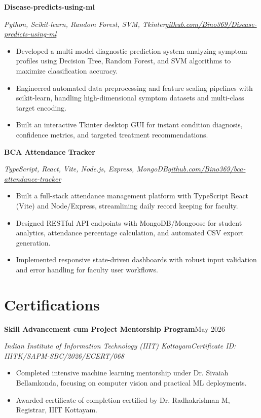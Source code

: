 \documentclass[10pt,a4paper]{article}
\newcommand{\resumeSubheading}[4]{%
  \textbf{#1}\hfill #2\par
  \textit{#3}\hfill \textit{#4}\par\vspace{1.5pt}%
}
\newenvironment{resumeEntry}[4]{
  \resumeSubheading{#1}{#2}{#3}{#4}
  \begin{itemize}
}{
  \end{itemize}\vspace{3.5pt}
}
\newcommand{\ghuser}{Bino369}
\newcommand{\ghrepo}[1]{\href{https://github.com/\ghuser/#1}{github.com/\ghuser/#1}}
\begin{document}
\begin{resumeEntry}
  {Disease-predicts-using-ml}{}
  {Python, Scikit-learn, Random Forest, SVM, Tkinter}{\ghrepo{Disease-predicts-using-ml}}
  \item Developed a multi-model diagnostic prediction system analyzing symptom profiles using Decision Tree, Random Forest, and SVM algorithms to maximize classification accuracy.
  \item Engineered automated data preprocessing and feature scaling pipelines with scikit-learn, handling high-dimensional symptom datasets and multi-class target encoding.
  \item Built an interactive Tkinter desktop GUI for instant condition diagnosis, confidence metrics, and targeted treatment recommendations.
\end{resumeEntry}

\begin{resumeEntry}
  {BCA Attendance Tracker}{}
  {TypeScript, React, Vite, Node.js, Express, MongoDB}{\ghrepo{bca-attendance-tracker}}
  \item Built a full-stack attendance management platform with TypeScript React (Vite) and Node/Express, streamlining daily record keeping for faculty.
  \item Designed RESTful API endpoints with MongoDB/Mongoose for student analytics, attendance percentage calculation, and automated CSV export generation.
  \item Implemented responsive state-driven dashboards with robust input validation and error handling for faculty user workflows.
\end{resumeEntry}

\section*{Certifications}
\begin{resumeEntry}
  {Skill Advancement cum Project Mentorship Program}{May 2026}
  {Indian Institute of Information Technology (IIIT) Kottayam}{Certificate ID: IIITK/SAPM-SBC/2026/ECERT/068}
  \item Completed intensive machine learning mentorship under Dr. Sivaiah Bellamkonda, focusing on computer vision and practical ML deployments.
  \item Awarded certificate of completion certified by Dr. Radhakrishnan M, Registrar, IIIT Kottayam.
\end{resumeEntry}
\end{document}
